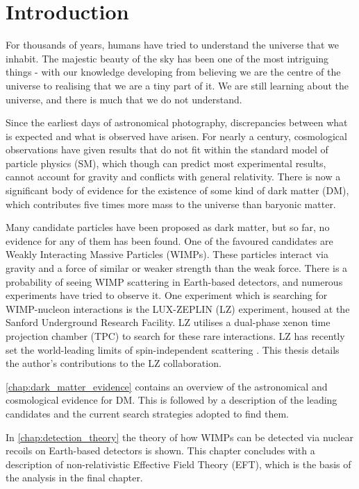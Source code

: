 \chapter{Introduction}
\par
For thousands of years, humans have tried to understand the universe that we inhabit.
The majestic beauty of the sky has been one of the most intriguing things - with our knowledge developing from believing we are the centre of the universe to realising that we are a tiny part of it.
We are still learning about the universe, and there is much that we do not understand.
\par
Since the earliest days of astronomical photography, discrepancies between what is expected and what is observed have arisen.
For nearly a century, cosmological observations have given results that do not fit within the standard model of particle physics (SM), which though can predict most experimental results, cannot account for gravity and conflicts with general relativity. 
There is now a significant body of evidence for the existence of some kind of dark matter (DM), which contributes five times more mass to the universe than baryonic matter.
\par
Many candidate particles have been proposed as dark matter, but so far, no evidence for any of them has been found.
One of the favoured candidates are Weakly Interacting Massive Particles (WIMPs).
These particles interact via gravity and a force of similar or weaker strength than the weak force.
There is a probability of seeing WIMP scattering in Earth-based detectors, and numerous experiments have tried to observe it.
One experiment which is searching for WIMP-nucleon interactions is the LUX-ZEPLIN (LZ) experiment, housed at the Sanford Underground Research Facility.
LZ utilises a dual-phase xenon time projection chamber (TPC) to search for these rare interactions.
LZ has recently set the world-leading limits of spin-independent scattering \cite{lz_ws_sr1_ref}.
This thesis details the author's contributions to the LZ collaboration.

\par
\autoref{chap:dark_matter_evidence} contains an overview of the astronomical and cosmological evidence for DM.
This is followed by a description of the leading candidates and the current search strategies adopted to find them.

\par
In \autoref{chap:detection_theory} the theory of how WIMPs can be detected via nuclear recoils on Earth-based detectors is shown.
This chapter concludes with a description of non-relativistic Effective Field Theory (EFT), which is the basis of the analysis in the final chapter.

